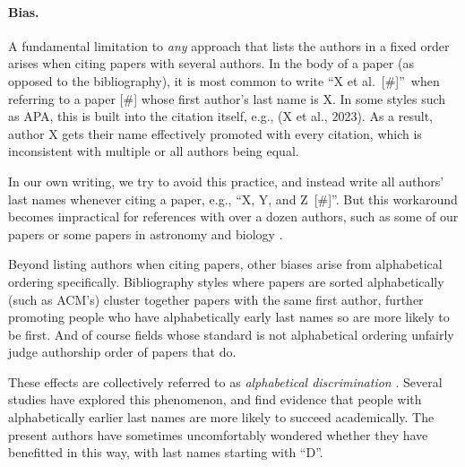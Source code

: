 \documentclass[natbib,authoryear]{sigtbd17-style}
\begin{document}
\paragraph{Bias.}

A fundamental limitation to \emph{any} approach that lists the authors
in a fixed order arises when citing papers with several authors.
In the body of a paper (as opposed to the bibliography), it is most common
to write ``X et al.~[\#]''\ when referring to a paper [\#]
whose first author's last name is X.
In some styles such as APA, this is built into the citation itself,
e.g., (X et al., 2023).
As a result, author X gets their name effectively promoted with every citation,
which is inconsistent with multiple or all authors being equal.

In our own writing, we try to avoid this practice, and instead
write all authors' last names whenever citing a paper,
e.g., ``X, Y, and Z~[\#]''.
But this workaround becomes impractical for references with over a dozen
authors, such as some of our papers
\cite{ArithmeticGames_ISAAC2020,LessThanEdgeMatching_JIP}
or some papers in astronomy \cite{reverse-alphabetical} and
biology \cite{human-genome}.

Beyond listing authors when citing papers,
other biases arise from alphabetical ordering specifically.
Bibliography styles where papers are sorted alphabetically (such as ACM's)
cluster together papers with the same first author, further promoting people
who have alphabetically early last names so are more likely to be first.
And of course fields whose standard is not alphabetical ordering
unfairly judge authorship order of papers that do.

These effects are collectively referred to as
\emph{alphabetical discrimination} \cite{alphabetical-discrimination}.
Several studies have explored this phenomenon, and find evidence that
people with alphabetically earlier last names are more likely to succeed
academically.
The present authors have sometimes uncomfortably wondered whether they have
benefitted in this way, with last names starting with ``D''.
\end{document}
